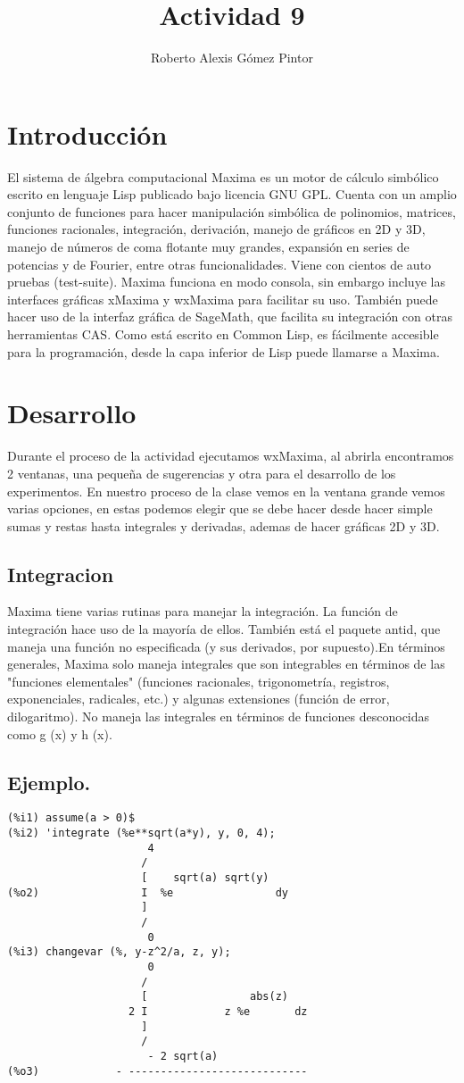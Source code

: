 \documentclass{article}
\title{Actividad 9}
\author{Roberto Alexis Gómez Pintor}
\begin{document}
\maketitle
\section{Introducción}
El sistema de álgebra computacional Maxima es un motor de cálculo simbólico escrito en lenguaje Lisp publicado bajo licencia GNU GPL. Cuenta con un amplio conjunto de funciones para hacer manipulación simbólica de polinomios, matrices, funciones racionales, integración, derivación, manejo de gráficos en 2D y 3D, manejo de números de coma flotante muy grandes, expansión en series de potencias y de Fourier, entre otras funcionalidades. Viene con cientos de auto pruebas (test-suite). Maxima funciona en modo consola, sin embargo incluye las interfaces gráficas xMaxima y wxMaxima para facilitar su uso. También puede hacer uso de la interfaz gráfica de SageMath, que facilita su integración con otras herramientas CAS. Como está escrito en Common Lisp, es fácilmente accesible para la programación, desde la capa inferior de Lisp puede llamarse a Maxima.
\section{Desarrollo}
Durante el proceso de la actividad ejecutamos wxMaxima, al abrirla encontramos 2 ventanas, una pequeña de sugerencias y otra para el desarrollo de los experimentos. En nuestro proceso de la clase vemos en la ventana grande vemos varias opciones, en estas podemos elegir que se debe hacer desde hacer simple sumas y restas hasta integrales y derivadas, ademas de hacer gráficas 2D y 3D.
\subsection{Integracion}
Maxima tiene varias rutinas para manejar la integración. La función de integración hace uso de la mayoría de ellos. También está el paquete antid, que maneja una función no especificada (y sus derivados, por supuesto).En términos generales, Maxima solo maneja integrales que son integrables en términos de las "funciones elementales" (funciones racionales, trigonometría, registros, exponenciales, radicales, etc.) y algunas extensiones (función de error, dilogaritmo). No maneja las integrales en términos de funciones desconocidas como g (x) y h (x).
\subsection{Ejemplo.}
\begin{verbatim}
(%i1) assume(a > 0)$
(%i2) 'integrate (%e**sqrt(a*y), y, 0, 4);
                      4
                     /
                     [    sqrt(a) sqrt(y)
(%o2)                I  %e                dy
                     ]
                     /
                      0
(%i3) changevar (%, y-z^2/a, z, y);
                      0
                     /
                     [                abs(z)
                   2 I            z %e       dz
                     ]
                     /
                      - 2 sqrt(a)
(%o3)            - ----------------------------
\end{verbatim}
\end{document}
